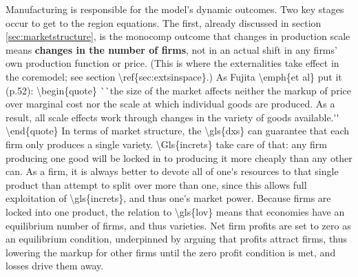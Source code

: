 Manufacturing is responsible for the model's dynamic outcomes. Two key stages occur to get to the region equations. The first, already discussed in section \ref{sec:marketstructure}, is the \gls{monocomp} outcome that changes in production scale means \textbf{changes in the number of firms}, not in an actual shift in any firms' own production function or price. (This is where the externalities take effect in the \gls{coremodel; see section \ref{sec:extsinspace}.) As Fujita \emph{et al} put it (p.52):

\begin{quote}
``the size of the market affects neither the markup of price over marginal cost nor the scale at which individual goods are produced. As a result, all scale effects work through changes in the variety of goods available.''
\end{quote}

In terms of market structure, the \gls{dxs} can guarantee that each firm only produces a single variety. \Gls{increts} take care of that: any firm producing one good will be locked in to producing it more cheaply than any other can. As a firm, it is always better to devote all of one's resources to that single product than attempt to split over more than one, since this allows full exploitation of \gls{increts}, and thus one's market power.

Because firms are locked into one product, the relation to \gls{lov} means that economies have an equilibrium number of firms, and thus varieties. Net firm profits are set to zero as an equilibrium condition, underpinned by arguing that profits attract firms, thus lowering the markup for other firms until the zero profit condition is met, and losses drive them away. 

}

